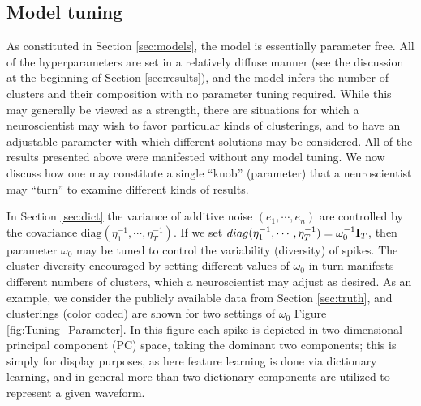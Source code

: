 \documentclass[journal]{IEEEtran}
\begin{document}
\subsection{Model tuning}

As constituted in Section \ref{sec:models}, the model is essentially parameter free. All of the hyperparameters are set in a relatively diffuse manner (see the discussion at the beginning of Section \ref{sec:results}), and the model infers the number of clusters and their composition with no parameter tuning required. While this may generally be viewed as a strength, there are situations for which a neuroscientist may wish to favor particular kinds of clusterings, and to have an adjustable parameter with which different solutions may be considered. All of the results presented above were manifested without any model tuning. We now discuss how one may constitute a single ``knob'' (parameter) that a neuroscientist may ``turn'' to examine different kinds of results.

In Section \ref{sec:dict} the variance of additive noise $(e_1,\cdots, e_n)$ are controlled by the covariance $\mbox{diag}(\eta_1^{-1},\cdots, \eta_T^{-1})$. If we set $\relax{diag}(\eta_1^{-1},\cdots, \eta_T^{-1})=\omega_0^{-1}{\mathbf I}_T$, then parameter $\omega_0$ may be tuned to control the variability (diversity) of spikes. The cluster diversity encouraged by setting different values of $\omega_0$ in turn manifests different numbers of clusters, which a neuroscientist may adjust as desired. As an example, we consider the publicly available data from Section \ref{sec:truth}, and clusterings (color coded) are shown for two settings of $\omega_0$ Figure \ref{fig:Tuning_Parameter}. In this figure each spike is depicted in two-dimensional principal component (PC) space, taking the dominant two components; this is simply for display purposes, as here feature learning is done via dictionary learning, and in general more than two dictionary components are utilized to represent a given waveform.
\end{document}
